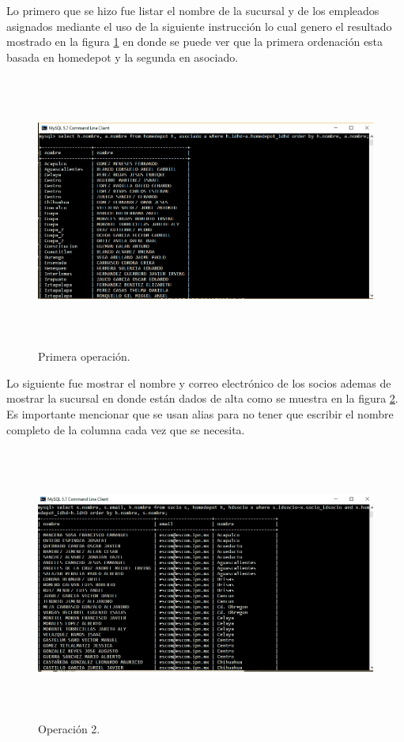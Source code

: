 \documentclass[12pt, titlepage]{article}
\begin{document}
Lo primero que se hizo fue listar el nombre de la sucursal y de los empleados asignados mediante el uso de la siguiente instrucción lo cual genero el resultado mostrado en la figura \ref{fig:comando1} en donde se puede ver que la primera ordenación esta basada en homedepot y la segunda en asociado.
 \begin{figure}[H]
	\begin{center}
		\includegraphics[width=16cm, height=9cm]{img/comando1.png}
		\caption{Primera operación.}
		\label{fig:comando1}
	\end{center}
\end{figure}
Lo siguiente fue mostrar el nombre y correo electrónico de los socios ademas de mostrar la sucursal en donde están dados de alta como se muestra en la figura \ref{fig:comando2}. Es importante mencionar que se usan alias para no tener que escribir el nombre completo de la columna cada vez que se necesita.
 \begin{figure}[H]
	\begin{center}
		\includegraphics[width=16cm, height=9cm]{img/comando2.png}
		\caption{Operación 2.}
		\label{fig:comando2}
	\end{center}
\end{figure}
\end{document}
